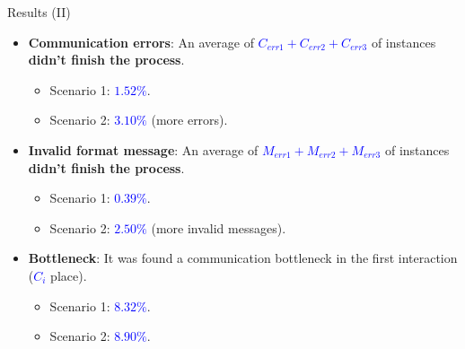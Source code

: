 \documentclass[xcolor=svgnames]{beamer}
\begin{document}
  \begin{frame}{ Results (II)}
      \begin{itemize}
         \item <1-> \textbf{Communication errors}: An average of  \textcolor{blue}{\textbf{$C_{err1}+C_{err2}+C_{err3}$}} of instances \textbf{didn't finish the process}.
            \begin{itemize}
              \item Scenario 1: \textcolor{blue}{$1.52\%$}.
              \item Scenario 2: \textcolor{blue}{$3.10\%$} (more errors).
            \end{itemize}
         \item <2-> \textbf{Invalid format message}: An average of  \textcolor{blue}{\textbf{$M_{err1}+M_{err2}+M_{err3}$}} of instances \textbf{didn't finish the process}.
            \begin{itemize}
              \item Scenario 1: \textcolor{blue}{$0.39\%$}.
              \item Scenario 2: \textcolor{blue}{$2.50\%$} (more invalid messages).
            \end{itemize}
        \item <3->\textbf{Bottleneck}: It was found a communication bottleneck in the first interaction (\textcolor{blue}{$C_i$} place).
            \begin{itemize}
              \item Scenario 1: \textcolor{blue}{$8.32\%$}.
              \item Scenario 2: \textcolor{blue}{$8.90\%$}.
            \end{itemize}

      \end{itemize}
  \end{frame}




\end{document}
